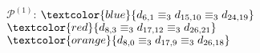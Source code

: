 
\begin{figure}[p]

    \noindent{}

    \captionsetup{singlelinecheck=off}
    \caption[.]{$\mathcal{P}^{(1)}$:
        \footnotesize{
        $\textcolor{blue}{d_{6,1}\equiv_{3}d_{15,10}\equiv_{3}d_{24,19}}$
        $\textcolor{red}{d_{8,3}\equiv_{3}d_{17,12}\equiv_{3}d_{26,21}}$
        $\textcolor{orange}{d_{8,0}\equiv_{3}d_{17,9}\equiv_{3}d_{26,18}}$ 
        }}

    \label{fig:pascal-multiples-over-antidiagonal}

\end{figure}

